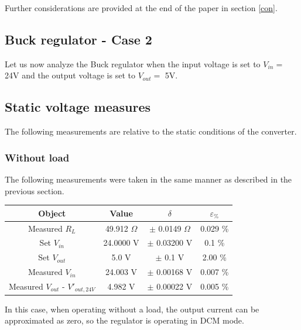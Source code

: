 \documentclass[../main.tex]{subfiles}
\begin{document}
Further considerations are provided at the end of the paper in section \ref{con}.





\vspace{1cm}
\subsection{Buck regulator - Case 2}

Let us now analyze the Buck regulator when the input voltage is set to $V_{in} = $ 24V and the output voltage is set to $V_{out} = $ 5V.

\subsection*{Static voltage measures}

The following measurements are relative to the static conditions of the converter.

\subsubsection*{Without load}

The following measurements were taken in the same manner as described in the previous section.

\begin{center}
\begin{tabular}{c c c c}
\textbf{Object} & \textbf{Value} & $\delta$ & $\varepsilon_{\%}$  \\
\hline
Measured $R_{L}$ & 49.912 $\Omega$ & $\pm$ 0.0149 $\Omega$ & 0.029 \% \\ 
\hline
Set $V_{in}$ & 24.0000 V & $\pm$ 0.03200 V & 0.1 \% \\ 
\hline
Set $V_{out}$ & 5.0 V  & $\pm$ 0.1 V  & 2.00 \%\\ 
\hline
Measured $V_{in}$ & 24.003 V & $\pm$ 0.00168 V &  0.007 \% \\ 
\hline
Measured $V_{out}$ - $V'_{out,24V}$  & 4.982 V & $\pm$ 0.00022 V & 0.005 \% \\

\end{tabular}
\end{center}

In this case, when operating without a load, the output current can be approximated as zero, so the regulator is operating in DCM mode.
\end{document}
